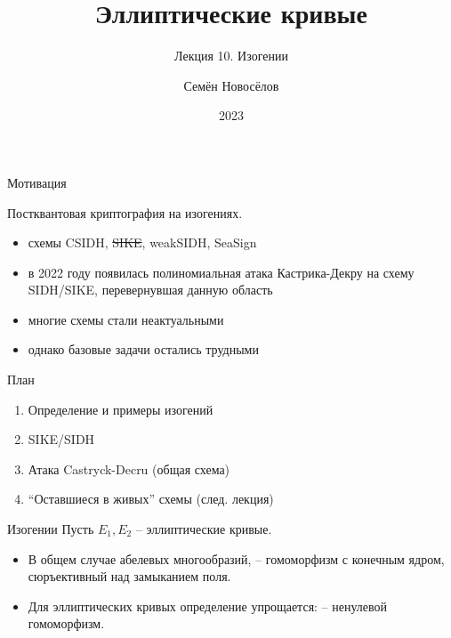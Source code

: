 \documentclass{beamer}
\title{Эллиптические кривые}
\subtitle{Лекция 10. Изогении}
\author{Семён Новосёлов}
\institute{БФУ им. И. Канта}
\date{2023}
\begin{document}
\frame{\titlepage}

\newcommand{\UserA}{{\structure{{\Large\faUserSecret}}}}
\newcommand{\UserB}{{\structure{{\Large\faCat}}}}

\begin{frame}{Мотивация}

Постквантовая криптография на изогениях.
\vspace{0.5em}
	
\begin{itemize}
	\item схемы CSIDH, \sout{SIKE}, weakSIDH, SeaSign
	\item в 2022 году появилась полиномиальная атака Кастрика-Декру на схему SIDH/SIKE, перевернувшая данную область
	\item многие схемы стали неактуальными
	\item однако базовые задачи остались трудными
\end{itemize}
\end{frame}

\begin{frame}{План}
\begin{enumerate}
	\item Определение и примеры изогений
	\item SIKE/SIDH
	\item Атака Castryck-Decru (общая схема)
	\item ``Оставшиеся в живых'' схемы (след. лекция)
\end{enumerate}
\end{frame}

\begin{frame}{Изогении}
Пусть $E_1, E_2$ -- эллиптические кривые.

\begin{itemize}
    \item В общем случае абелевых многообразий,  -- гомоморфизм с конечным ядром, сюръективный над замыканием поля.
    \item Для эллиптических кривых определение упрощается:  -- ненулевой гомоморфизм.
\end{itemize}
\end{frame}
\end{document}
